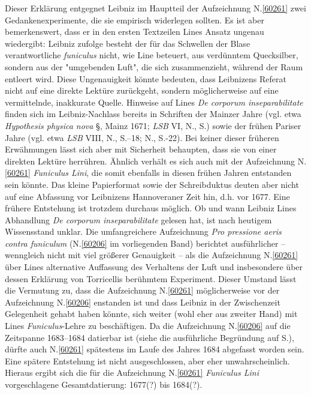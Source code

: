 \begin{ledgroup}
\pend%
\pstart%
Dieser Erklärung entgegnet Leibniz im Hauptteil der Aufzeichnung N.\;\ref{60261} zwei Gedankenexperimente, die sie empirisch widerlegen sollten.
Es ist aber bemerkenswert, dass er in den ersten Textzeilen Lines Ansatz ungenau wiedergibt:
Leibniz zufolge besteht der für das Schwellen der Blase verantwortliche \textit{funiculus} nicht, wie Line beteuert, aus verdünntem Quecksilber, sondern aus der "umgebenden Luft", die sich zusammenzieht, während der Raum entleert wird.
Diese Ungenauigkeit könnte bedeuten, dass Leibnizens Referat nicht auf eine direkte Lektüre zurückgeht, sondern möglicherweise auf eine vermittelnde, inakkurate Quelle.
\pend%
\pstart%
Hinweise auf Lines \textit{De corporum inseparabilitate}\cite{00072} finden sich im Leibniz-Nachlass bereits in Schriften der Mainzer Jahre (vgl. etwa \textit{Hypothesis physica nova} §, Mainz 1671; \textit{LSB} VI, N., S.)\cite{00256} sowie der frühen Pariser Jahre (vgl. etwa \textit{LSB} VIII, N.\;, S.--18;\cite{01265} N., S.-22).\cite{01190}
Bei keiner dieser früheren Erwähmungen lässt sich aber mit Sicherheit behaupten, dass sie von einer direkten Lektüre herrühren.
Ähnlich verhält es sich auch mit der Aufzeichnung N.\;\ref{60261} \textit{Funiculus Lini}, die somit ebenfalls in diesen frühen Jahren entstanden sein könnte.
Das kleine Papierformat sowie der Schreibduktus deuten aber nicht auf eine Abfassung vor Leibnizens Hannoveraner Zeit hin, d.h. vor 1677.
Eine frühere Entstehung ist trotzdem durchaus möglich.
\pend%
\pstart%
Ob und wann Leibniz Lines Abhandlung \textit{De corporum inseparabilitate}\cite{00072} gelesen hat, ist nach heutigem Wissensstand unklar.
Die umfangreichere Aufzeichnung \textit{Pro pressione aeris contra funiculum} (N.\;\ref{60206} im vorliegenden Band) berichtet ausführlicher -- wenngleich nicht mit viel größerer Genauigkeit -- als die Aufzeichnung N.\;\ref{60261} über Lines alternative Auffassung des Verhaltens der Luft und insbesondere über dessen Erklärung von Torricellis berühmtem Experiment.
Dieser Umstand lässt die Vermutung zu, dass die Aufzeichnung N.\;\ref{60261} möglicherweise vor der Aufzeichnung N.\;\ref{60206} enstanden ist und dass Leibniz in der Zwischenzeit Gelegenheit gehabt haben könnte, sich weiter (wohl eher aus zweiter Hand) mit Lines \textit{Funiculus}-Lehre zu beschäftigen.
Da die Aufzeichnung N.\;\ref{60206} auf die Zeitspanne 1683--1684 datierbar ist (siehe die ausführliche Begründung auf S.\;\pageref{60206_dat}), dürfte auch N.\;\ref{60261} spätestens im Laufe des Jahres 1684 abgefasst worden sein.
Eine spätere Entstehung ist nicht ausgeschlossen, aber eher unwahrscheinlich.
Hieraus ergibt sich die für die Aufzeichnung N.\;\ref{60261} \textit{Funiculus Lini} vorgeschlagene Gesamtdatierung: 1677\;(?) bis 1684\;(?).
\pend%
\end{ledgroup}%
